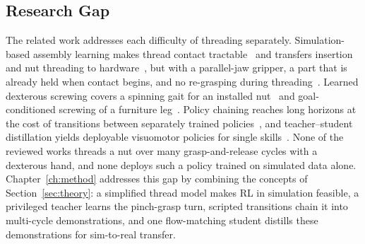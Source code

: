 \subsection{Research Gap}\label{sec:related-gap}

The related work addresses each difficulty of threading separately. Simulation-based assembly learning makes thread contact tractable~\cite{Narang2022} and transfers insertion and nut threading to hardware~\cite{Tang2023industreal,Noseworthy2025}, but with a parallel-jaw gripper, a part that is already held when contact begins, and no re-grasping during threading~\cite{Narang2022,Noseworthy2025}. Learned dexterous screwing covers a spinning gait for an installed nut~\cite{Hsieh2026} and goal-conditioned screwing of a furniture leg~\cite{Lum2026}. Policy chaining reaches long horizons at the cost of transitions between separately trained policies~\cite{Lee2022,Chen2023}, and teacher--student distillation yields deployable visuomotor policies for single skills~\cite{Lum2024,Singh2025}. None of the reviewed works threads a nut over many grasp-and-release cycles with a dexterous hand, and none deploys such a policy trained on simulated data alone. Chapter~\ref{ch:method} addresses this gap by combining the concepts of Section~\ref{sec:theory}: a simplified thread model makes \ac{RL} in simulation feasible, a privileged teacher learns the pinch-grasp turn, scripted transitions chain it into multi-cycle demonstrations, and one flow-matching student distills these demonstrations for sim-to-real transfer.
